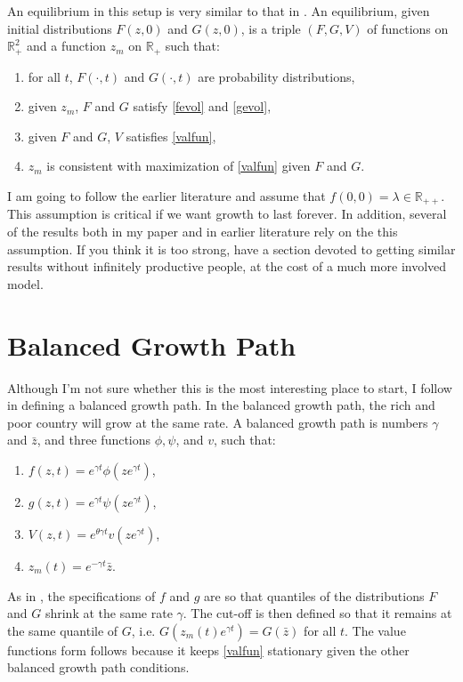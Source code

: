 \documentclass[12pt]{article}
\begin{document}
An equilibrium in this setup is very similar to that in \citet{LucasMoll2012}.
An equilibrium, given initial distributions $F(z,0)$ and $G(z,0)$, is a triple $(F,G,V)$ of functions on $\mathbb{R}_+^2$ and a function $z_m$ on $\mathbb{R}_{+}$ such that:
\begin{enumerate}
  \item for all $t$, $F(\cdot,t)$ and $G(\cdot,t)$ are probability distributions,
  \item given $z_m$, $F$ and $G$ satisfy \eqref{fevol} and \eqref{gevol},
  \item given $F$ and $G$, $V$ satisfies \eqref{valfun},
  \item $z_m$ is consistent with maximization of \eqref{valfun} given $F$ and $G$. 
\end{enumerate}

I am going to follow the earlier literature and assume that $f(0,0) = \lambda \in \mathbb{R}_{++}$.  This assumption is critical if we want growth to last forever.  In addition, several of the results both in my paper and in earlier literature rely on the this assumption.  If you think it is too strong, \citet{LucasMoll2012} have a section devoted to getting similar results without infinitely productive people, at the cost of a much more involved model.

\section{Balanced Growth Path}
Although I'm not sure whether this is the most interesting place to start, I follow \citet{LucasMoll2012} in defining a balanced growth path.
In the balanced growth path, the rich and poor country will grow at the same rate.
A balanced growth path is  numbers $\gamma$ and $\bar{z}$, and three functions $\phi,\psi$, and $v$, such that:
\begin{enumerate}
  \item $f(z,t) = e^{\gamma t} \phi(z e^{\gamma t})$,
  \item $g(z,t) = e^{\gamma t} \psi(z e^{\gamma t})$,
  \item $V(z,t) = e^{\theta \gamma t} v(ze^{\gamma t})$,
  \item $z_m(t) = e^{-\gamma t} \bar{z}$.
\end{enumerate}
As in \citet{LucasMoll2012}, the specifications of $f$ and $g$ are so that quantiles of the distributions $F$ and $G$ shrink at the same rate $\gamma$.
The cut-off is then defined so that it remains at the same quantile of $G$, i.e. $G(z_m(t) e^{\gamma t}) = G(\bar{z})$ for all $t$.
The value functions form follows because it keeps \eqref{valfun} stationary given the other balanced growth path conditions.
\end{document}
